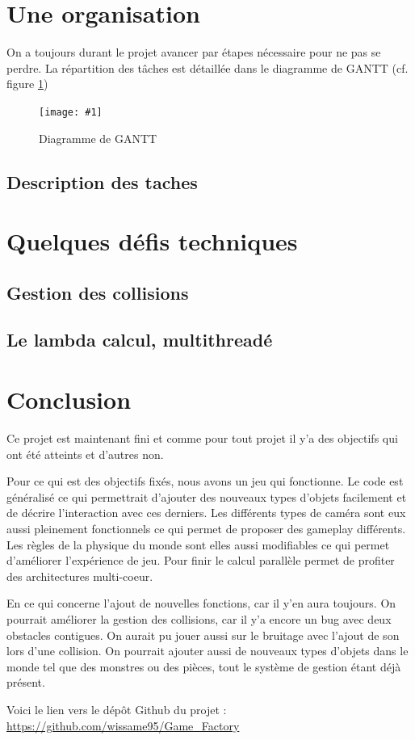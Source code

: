 \documentclass[french,12pt]{article}
\newcommand{\monimage}[4]{
\par\noindent
\begin{figure}[p] %
\begin{center}
\texttt{[image: \#1]} %
\caption{#2} %
\label{#3} %
\end{center}
\end{figure} %
}
\newcommand{\ml}[0]{\par\noindent}
\begin{document}
\section{Une organisation}

On a toujours durant le projet avancer par étapes nécessaire pour ne pas se perdre. La répartition des tâches est détaillée dans le diagramme de GANTT (cf. figure \ref{dg})

\monimage{gantt.pdf}{Diagramme de GANTT}{dg}{1}



\subsection{Description des taches}



\section{Quelques défis techniques}


\subsection{Gestion des collisions}


\subsection{Le lambda calcul, multithreadé}


\section{Conclusion}
Ce projet est maintenant fini et comme pour tout projet il y'a des objectifs qui ont été atteints et d'autres non.
\ml
Pour ce qui est des objectifs fixés, nous avons un jeu qui fonctionne. Le code est généralisé ce qui permettrait d'ajouter des nouveaux types d'objets facilement et de décrire l'interaction avec ces derniers. Les différents types de caméra sont eux aussi pleinement fonctionnels ce qui permet de proposer des gameplay différents. Les règles de la physique du monde sont elles aussi modifiables ce qui permet d'améliorer l'expérience de jeu. Pour finir le calcul parallèle permet de profiter des architectures multi-coeur. 
\ml
En ce qui concerne l'ajout de nouvelles fonctions, car il y'en aura toujours. On pourrait améliorer la gestion des collisions, car il y'a encore un bug avec deux obstacles contigues. On aurait pu jouer aussi sur le bruitage avec l'ajout de son lors d'une collision. On pourrait ajouter aussi de nouveaux types d'objets dans le monde tel que des monstres ou des pièces, tout le système de gestion étant déjà présent.
\ml\ml
Voici le lien vers le dépôt Github du projet : \url{https://github.com/wissame95/Game_Factory}

\newpage
\listoffigures
\newpage
\end{document}

